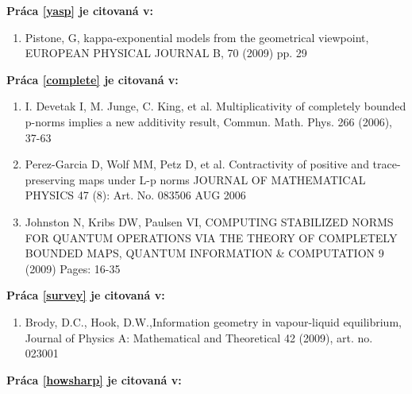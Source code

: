 \documentclass[A4paper]{article}
\begin{document}
{\bf Pr\'aca \ref{yasp} je citovan\'a v:}

\begin{enumerate}
\setcounter{enumi}{\value{poo}}
\item   Pistone, G,  kappa-exponential models from the geometrical viewpoint, 
 EUROPEAN PHYSICAL JOURNAL B,  70 (2009)  pp. 29 
\setcounter{poo}{\value{enumi}}
 
\end{enumerate}

{\bf Pr\'aca \ref{complete} je citovan\'a v:}

\begin{enumerate}
\setcounter{enumi}{\value{poo}}
\item I.  Devetak I, M. Junge, C. King, et al.
Multiplicativity of completely bounded p-norms implies a new additivity result,
Commun.  Math.  Phys.  266 (2006), 37-63

\item  Perez-Garcia D, Wolf MM, Petz D, et al.
Contractivity of positive and trace-preserving maps under L-p norms 
JOURNAL OF MATHEMATICAL PHYSICS 47 (8): Art. No. 083506 AUG 2006

\item  Johnston N, Kribs DW, Paulsen VI,  COMPUTING STABILIZED NORMS FOR QUANTUM OPERATIONS VIA THE THEORY OF COMPLETELY BOUNDED MAPS, QUANTUM INFORMATION \& COMPUTATION  9  (2009)   Pages: 16-35 
\setcounter{poo}{\value{enumi}}

\end{enumerate}


{\bf Pr\'aca \ref{survey} je citovan\'a v:}
\begin{enumerate}
\setcounter{enumi}{\value{poo}}
\item  Brody, D.C., Hook, D.W.,Information geometry in vapour-liquid
equilibrium, Journal of Physics A: Mathematical and Theoretical 42 (2009),
art. no. 023001   
\setcounter{poo}{\value{enumi}}

\end{enumerate}



{\bf Pr\'aca \ref{howsharp} je citovan\'a v:}
\end{document}
